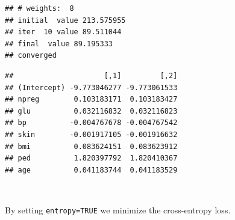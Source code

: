 \documentclass[10pt,ignorenonframetext,]{beamer}
\newenvironment{Shaded}{\begin{snugshade}}{\end{snugshade}}
\newcommand{\CommentTok}[1]{\textcolor[rgb]{0.56,0.35,0.01}{\textit{#1}}}
\newcommand{\DataTypeTok}[1]{\textcolor[rgb]{0.13,0.29,0.53}{#1}}
\newcommand{\DecValTok}[1]{\textcolor[rgb]{0.00,0.00,0.81}{#1}}
\newcommand{\FloatTok}[1]{\textcolor[rgb]{0.00,0.00,0.81}{#1}}
\newcommand{\KeywordTok}[1]{\textcolor[rgb]{0.13,0.29,0.53}{\textbf{#1}}}
\newcommand{\NormalTok}[1]{#1}
\newcommand{\OperatorTok}[1]{\textcolor[rgb]{0.81,0.36,0.00}{\textbf{#1}}}
\newcommand{\OtherTok}[1]{\textcolor[rgb]{0.56,0.35,0.01}{#1}}
\newcommand{\StringTok}[1]{\textcolor[rgb]{0.31,0.60,0.02}{#1}}
\begin{document}
\begin{frame}[fragile]

\tiny

\begin{Shaded}
\end{Shaded}

\begin{verbatim}
## # weights:  8
## initial  value 213.575955 
## iter  10 value 89.511044
## final  value 89.195333 
## converged
\end{verbatim}

\begin{Shaded}
\end{Shaded}

\begin{verbatim}
##                     [,1]         [,2]
## (Intercept) -9.773046277 -9.773061533
## npreg        0.103183171  0.103183427
## glu          0.032116832  0.032116823
## bp          -0.004767678 -0.004767542
## skin        -0.001917105 -0.001916632
## bmi          0.083624151  0.083623912
## ped          1.820397792  1.820410367
## age          0.041183744  0.041183529
\end{verbatim}

\(~\)

\normalsize

By setting \texttt{entropy=TRUE} we minimize the cross-entropy loss.

\end{frame}
\end{document}
